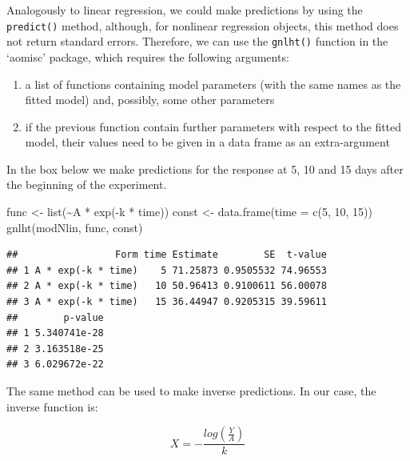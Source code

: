 \documentclass[a4paper,12pt,oneside]{book}
\providecommand{\tightlist}{%
  \setlength{\itemsep}{0pt}\setlength{\parskip}{0pt}}
\newenvironment{Shaded}{\begin{snugshade}}{\end{snugshade}}
\newcommand{\DecValTok}[1]{#1}
\newcommand{\SpecialCharTok}[1]{#1}
\newcommand{\OtherTok}[1]{#1}
\newcommand{\FunctionTok}[1]{#1}
\newcommand{\AttributeTok}[1]{#1}
\newcommand{\NormalTok}[1]{#1}
\begin{document}
Analogously to linear regression, we could make predictions by using the \texttt{predict()} method, although, for nonlinear regression objects, this method does not return standard errors. Therefore, we can use the \texttt{gnlht()} function in the `aomisc' package, which requires the following arguments:

\begin{enumerate}
\def\labelenumi{\arabic{enumi}.}
\tightlist
\item
  a list of functions containing model parameters (with the same names as the fitted model) and, possibly, some other parameters
\item
  if the previous function contain further parameters with respect to the fitted model, their values need to be given in a data frame as an extra-argument
\end{enumerate}

In the box below we make predictions for the response at 5, 10 and 15 days after the beginning of the experiment.

\vspace{12pt}

\begin{Shaded}
\begin{Highlighting}[]
\NormalTok{func }\OtherTok{\textless{}{-}} \FunctionTok{list}\NormalTok{(}\SpecialCharTok{\textasciitilde{}}\NormalTok{A }\SpecialCharTok{*} \FunctionTok{exp}\NormalTok{(}\SpecialCharTok{{-}}\NormalTok{k }\SpecialCharTok{*}\NormalTok{ time))}
\NormalTok{const }\OtherTok{\textless{}{-}} \FunctionTok{data.frame}\NormalTok{(}\AttributeTok{time =} \FunctionTok{c}\NormalTok{(}\DecValTok{5}\NormalTok{, }\DecValTok{10}\NormalTok{, }\DecValTok{15}\NormalTok{)) }
\FunctionTok{gnlht}\NormalTok{(modNlin, func,  const)}
\end{Highlighting}
\end{Shaded}

\begin{verbatim}
##                 Form time Estimate        SE  t-value
## 1 A * exp(-k * time)    5 71.25873 0.9505532 74.96553
## 2 A * exp(-k * time)   10 50.96413 0.9100611 56.00078
## 3 A * exp(-k * time)   15 36.44947 0.9205315 39.59611
##        p-value
## 1 5.340741e-28
## 2 3.163518e-25
## 3 6.029672e-22
\end{verbatim}

The same method can be used to make inverse predictions. In our case, the inverse function is:

\[X = - \frac{log \left( \frac{Y}{A} \right)}{k}\]
\end{document}
